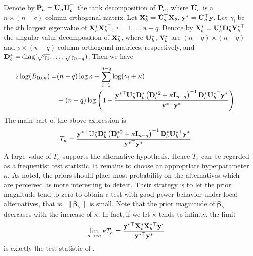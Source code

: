 \documentclass[11pt]{article}
\DeclareMathOperator{\mydiag}{diag}
\newcommand{\By}{\mathbf{y}}    \newcommand{\Bz}{\mathbf{z}}
\newcommand{\bfsym}[1]{\ensuremath{\boldsymbol{#1}}}
\def\bbeta{\bfsym \beta}
\theoremstyle{plain}
\theoremstyle{definition}
\theoremstyle{remark}
\begin{document}
Denote by $\tilde {\mathbf{P}}_a=\tilde{\mathbf{U}}_a \tilde{\mathbf{U}}_a^\top$ the rank decomposition of $\tilde {\mathbf{P}}_a$, where $\tilde{\mathbf{U}}_a$ is a $n\times (n-q)$ column orthogonal matrix.
Let $\mathbf{X}_b^* = \tilde{\mathbf{U}}_a^\top \mathbf{X}_b$, $\By^* =\tilde \BU_a^\top \By$.
Let $\gamma_i$ be the $i$th largest eigenvalue of $\mathbf{X}^*_b \mathbf{X}_b^{*\top}$, $i=1,\ldots, n-q$.
Denote by $\mathbf{X}_b^* =\mathbf{U}_{b}^* \mathbf{D}_{b}^* \mathbf{V}_b^{*\top}$ the singular value decomposition of $\mathbf{X}_{b}^*$, where  $\mathbf{U}_{b}^*$, $\mathbf{V}_b^*$ are $(n-q)\times (n-q)$ and $p\times (n-q)$ column orthogonal matrices, respectively, and $\BD_{b}^*=\mydiag (\sqrt {\gamma_1},\ldots, \sqrt{\gamma_{n-q}})$.
Then we have
\begin{equation*}
    \begin{split}
        2\log (B_{10,\kappa})
        =&
        (n-q)\log \kappa - \sum_{i=1}^{n-q}\log ( \gamma_i + \kappa )
        \\
         &-(n-q)\log\left(1-\frac{\By^{*\top} \BU_b^*  \BD_b^{*} \left(  \BD_b^{*2} + \kappa \BI_{n-q} \right)^{-1} \BD_b^{*}   \BU_b^{*\top} \By^* }{\By^{*\top} \By^*}\right)
         .
    \end{split}
\end{equation*}
The main part of the above expression is
\begin{equation*}
    T_{\kappa} = \frac{\By^{*\top} \BU_b^*  \BD_b^{*} \left(  \BD_b^{*2} + \kappa \BI_{n-q} \right)^{-1} \BD_b^{*}   \BU_b^{*\top} \By^* }{\By^{*\top} \By^*}.
\end{equation*}
A large value of $T_{\kappa}$ supports the alternative hypothesis.
Hence $T_{\kappa}$ can be regarded as a frequentist test statistic.
It remains to choose an appropriate hyperparameter $\kappa$.
As \cite{Goeman2006} noted, the priors should place most probability on the alternatives which are perceived as more interesting to detect.
Their strategy is to let the prior magnitude tend to zero to obtain a test with good power behavior under local alternatives, that is, $\|\bbeta_b\|$ is small.
Note that the prior magnitude of $\bbeta_b$ decreases with the increase of $\kappa$.
In fact, if we let $\kappa$ tends to infinity, the limit
\begin{equation*}
    \lim_{\kappa\to \infty} \kappa T_{\kappa} = \frac{\By^{*\top} \BX_b^* \BX_b^{*\top} \By^* }{\By^{*\top} \By^*}
\end{equation*}
is exactly the test statistic of \cite{Goeman2006}.
\end{document}
